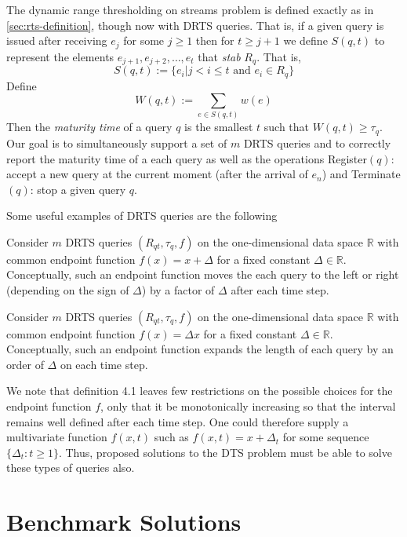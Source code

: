 The dynamic range thresholding on streams problem is defined exactly as in \cref{sec:rts-definition}, though now with DRTS queries. That is, if a given query is issued after receiving $e_j$ for some $j\geq 1$ then for $t\geq j+1$ we define $S(q,t)$ to represent the elements $e_{j+1},e_{j+2},\dots,e_t$ that \textit{stab} $R_q$. That is, 
$$S(q, t) := \{e_i | j < i \leq t \text{ and } e_i \in R_q\}$$
Define
$$W(q, t) := \sum_{e\in S(q,t)}w(e)$$
Then the \textit{maturity time} of a query $q$ is the smallest $t$ such that $W(q,t)\geq \tau_q$. Our goal is to simultaneously support a set of $m$ DRTS queries and to correctly report the maturity time of a each query as well as the operations Register$(q)$: accept a new query at the current moment (after the arrival of $e_n$) and Terminate$(q)$: stop a given query $q$.

Some useful examples of DRTS queries are the following

\begin{example} Consider $m$ DRTS queries $(R_{qt}, \tau_q, f)$ on the one-dimensional data space  $\mathbb{R}$ with common endpoint function $f(x) = x + \Delta$ for a fixed constant $\Delta\in\mathbb{R}$. Conceptually, such an endpoint function moves the each query to the left or right (depending on the sign of $\Delta$) by a factor of $\Delta$ after each time step.
\end{example}

\begin{example} Consider $m$ DRTS queries $(R_{qt}, \tau_q, f)$ on the one-dimensional data space  $\mathbb{R}$ with common endpoint function $f(x) = \Delta x$  for a fixed constant $\Delta\in\mathbb{R}$. Conceptually, such an endpoint function expands the length of each query by an order of $\Delta$ on each time step.
\end{example}
    
We note that definition 4.1 leaves few restrictions on the possible choices for the endpoint function $f$, only that it be monotonically increasing so that the interval remains well defined after each time step. One could therefore supply a multivariate function $f(x,t)$ such as $f(x, t) = x + \Delta_t$ for some sequence $\{\Delta_t: t\geq1\}$. Thus, proposed solutions to the DTS problem must be able to solve these types of queries also. 

\section{Benchmark Solutions}
\label{sec:drts-benchmark-solutions}

